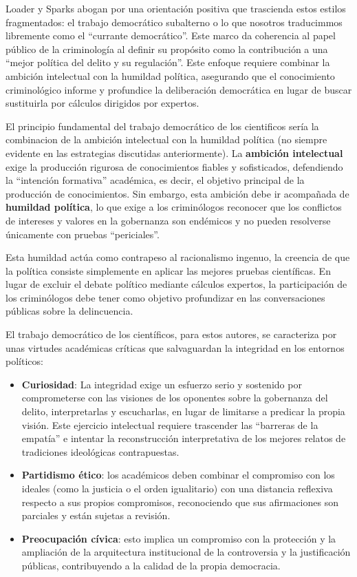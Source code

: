 \documentclass[
  spanish,
  letterpaper,
  DIV=11,
  numbers=noendperiod]{scrreprt}
\begin{document}
Loader y Sparks abogan por una orientación positiva que trascienda estos
estilos fragmentados: el trabajo democrático subalterno o lo que
nosotros traducimmos libremente como el ``currante democrático''. Este
marco da coherencia al papel público de la criminología al definir su
propósito como la contribución a una ``mejor política del delito y su
regulación''. Este enfoque requiere combinar la ambición intelectual con
la humildad política, asegurando que el conocimiento criminológico
informe y profundice la deliberación democrática en lugar de buscar
sustituirla por cálculos dirigidos por expertos.

El principio fundamental del trabajo democrático de los cientificos
sería la combinacion de la ambición intelectual con la humildad política
(no siempre evidente en las estrategias discutidas anteriormente). La
\textbf{ambición intelectual} exige la producción rigurosa de
conocimientos fiables y sofisticados, defendiendo la ``intención
formativa'' académica, es decir, el objetivo principal de la producción
de conocimientos. Sin embargo, esta ambición debe ir acompañada de
\textbf{humildad política}, lo que exige a los criminólogos reconocer
que los conflictos de intereses y valores en la gobernanza son endémicos
y no pueden resolverse únicamente con pruebas ``periciales''.

Esta humildad actúa como contrapeso al racionalismo ingenuo, la creencia
de que la política consiste simplemente en aplicar las mejores pruebas
científicas. En lugar de excluir el debate político mediante cálculos
expertos, la participación de los criminólogos debe tener como objetivo
profundizar en las conversaciones públicas sobre la delincuencia.

El trabajo democrático de los científicos, para estos autores, se
caracteriza por unas virtudes académicas críticas que salvaguardan la
integridad en los entornos políticos:

\begin{itemize}
\item
  \textbf{Curiosidad}: La integridad exige un esfuerzo serio y sostenido
  por comprometerse con las visiones de los oponentes sobre la
  gobernanza del delito, interpretarlas y escucharlas, en lugar de
  limitarse a predicar la propia visión. Este ejercicio intelectual
  requiere trascender las ``barreras de la empatía'' e intentar la
  reconstrucción interpretativa de los mejores relatos de tradiciones
  ideológicas contrapuestas.
\item
  \textbf{Partidismo ético}: los académicos deben combinar el compromiso
  con los ideales (como la justicia o el orden igualitario) con una
  distancia reflexiva respecto a sus propios compromisos, reconociendo
  que sus afirmaciones son parciales y están sujetas a revisión.
\item
  \textbf{Preocupación cívica}: esto implica un compromiso con la
  protección y la ampliación de la arquitectura institucional de la
  controversia y la justificación públicas, contribuyendo a la calidad
  de la propia democracia.
\end{itemize}
\end{document}
